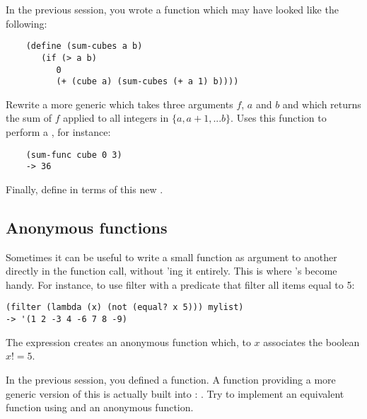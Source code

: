 \documentclass{../../../tp}
\begin{document}
\begin{instruction}
	In the previous session, you wrote a  function which may have looked like the following: 
	
	\begin{verbatim}
	(define (sum-cubes a b)
	   (if (> a b)
	      0
	      (+ (cube a) (sum-cubes (+ a 1) b))))
	\end{verbatim}
	
	Rewrite a more generic  which takes three arguments $f$, $a$ and $b$ and which returns the sum of $f$ applied to all integers in $\{a, a+1, ... b\}$. Uses this function to perform a , for instance:
	\begin{verbatim}
	(sum-func cube 0 3)
	-> 36
	\end{verbatim}
	
	Finally, define  in terms of this new .
\end{instruction}


\subsection{Anonymous functions}

Sometimes it can be useful to write a small function as argument to another directly in the function call, without 'ing it entirely. This is where 's become handy. For instance, to use filter with a predicate that filter all items equal to 5:

\begin{verbatim}
(filter (lambda (x) (not (equal? x 5))) mylist)
-> '(1 2 -3 4 -6 7 8 -9)
\end{verbatim}

The   expression creates an anonymous function which, to $x$ associates the boolean $x != 5$. 

\begin{instruction}
	In the previous session, you defined a  function. A function providing a more generic version of this is actually built into \scheme: . Try to implement an equivalent  function using   and an anonymous function.
\end{instruction}
\end{document}
